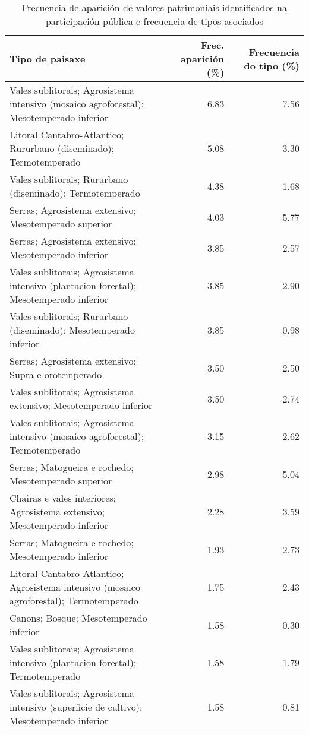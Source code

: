 \begin{table}[p]
\centering
\caption{Frecuencia de aparición de valores patrimoniais identificados na participación pública e frecuencia de tipos asociados} 
\label{vsixotpat}
\begin{tabular}{lrr}
  \hline
Tipo de paisaxe & Frec. aparición (\%) & Frecuencia do tipo (\%) \\ 
  \hline
Vales sublitorais; Agrosistema intensivo (mosaico agroforestal); Mesotemperado inferior & 6.83 & 7.56 \\ 
  Litoral Cantabro-Atlantico; Rururbano (diseminado); Termotemperado & 5.08 & 3.30 \\ 
  Vales sublitorais; Rururbano (diseminado); Termotemperado & 4.38 & 1.68 \\ 
  Serras; Agrosistema extensivo; Mesotemperado superior & 4.03 & 5.77 \\ 
  Serras; Agrosistema extensivo; Mesotemperado inferior & 3.85 & 2.57 \\ 
  Vales sublitorais; Agrosistema intensivo (plantacion forestal); Mesotemperado inferior & 3.85 & 2.90 \\ 
  Vales sublitorais; Rururbano (diseminado); Mesotemperado inferior & 3.85 & 0.98 \\ 
  Serras; Agrosistema extensivo; Supra e orotemperado & 3.50 & 2.50 \\ 
  Vales sublitorais; Agrosistema extensivo; Mesotemperado inferior & 3.50 & 2.74 \\ 
  Vales sublitorais; Agrosistema intensivo (mosaico agroforestal); Termotemperado & 3.15 & 2.62 \\ 
  Serras; Matogueira e rochedo; Mesotemperado superior & 2.98 & 5.04 \\ 
  Chairas e vales interiores; Agrosistema extensivo; Mesotemperado inferior & 2.28 & 3.59 \\ 
  Serras; Matogueira e rochedo; Mesotemperado inferior & 1.93 & 2.73 \\ 
  Litoral Cantabro-Atlantico; Agrosistema intensivo (mosaico agroforestal); Termotemperado & 1.75 & 2.43 \\ 
  Canons; Bosque; Mesotemperado inferior & 1.58 & 0.30 \\ 
  Vales sublitorais; Agrosistema intensivo (plantacion forestal); Termotemperado & 1.58 & 1.79 \\ 
  Vales sublitorais; Agrosistema intensivo (superficie de cultivo); Mesotemperado inferior & 1.58 & 0.81 \\ 

\end{tabular}
\end{table}
